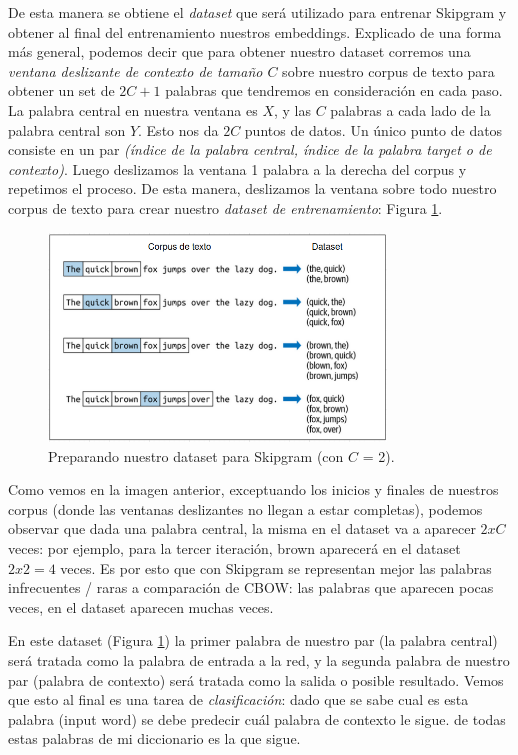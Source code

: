 \documentclass[12pt,a4paper]{article}
\begin{document}
\begin{sloppypar}
De esta manera se obtiene el \textit{dataset} que será utilizado para entrenar Skipgram y obtener al final del entrenamiento nuestros embeddings. Explicado de una forma más general, podemos decir que para obtener nuestro dataset corremos una \textit{ventana deslizante de contexto de tamaño $C$} sobre nuestro corpus de texto para obtener un set de $2C+1$ palabras que tendremos en consideración en cada paso. La palabra central en nuestra ventana es $X$, y las $C$ palabras a cada lado de la palabra central son $Y$. Esto nos da $2C$ puntos de datos. Un único punto de datos consiste en un par \textit{(índice de la palabra central, índice de la palabra target o de contexto)}. Luego deslizamos la ventana 1 palabra a la derecha del corpus y repetimos el proceso. De esta manera, deslizamos la ventana sobre todo nuestro corpus de texto para crear nuestro \textit{dataset de entrenamiento}: Figura \ref{fig:Imagen_NLP_21}. 

\begin{figure}[H]    
 \centering
 \includegraphics[width=0.8\textwidth]{images/NLP/21.png}
 \caption{Preparando nuestro dataset para Skipgram (con $C$ = 2)\cite{NLP_26}.}
 \label{fig:Imagen_NLP_21}
\end{figure}

Como vemos en la imagen anterior, exceptuando los inicios y finales de nuestros corpus (donde las ventanas deslizantes no llegan a estar completas), podemos observar que dada una palabra central, la misma en el dataset va a aparecer $2xC$ veces: por ejemplo, para la tercer iteración, brown aparecerá en el dataset $2x2=4$ veces. Es por esto que con Skipgram se representan mejor las palabras infrecuentes / raras a comparación de CBOW: las palabras que aparecen pocas veces, en el dataset aparecen muchas veces.

En este dataset (Figura \ref{fig:Imagen_NLP_21}) la primer palabra de nuestro par (la palabra central) será tratada como la palabra de entrada a la red, y la segunda palabra de nuestro par (palabra de contexto) será tratada como la salida o posible resultado. Vemos que esto al final es una tarea de \textit{clasificación}: dado que se sabe cual es esta palabra (input word) se debe predecir cuál palabra de contexto le sigue. de todas estas palabras de mi diccionario es la que sigue. 


\end{sloppypar}
\end{document}
